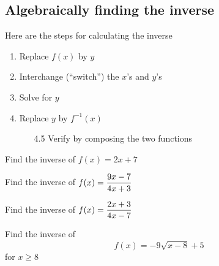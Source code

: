 \ifprintanswers\else\newpage\fi

\subsection{Algebraically finding the inverse}

Here are the steps for calculating the inverse

\begin{enumerate}[1)]
    \item Replace $f(x)$ by $y$
    \item Interchange (``switch'') the $x$'s and $y$'s
    \item Solve for $y$
    \item Replace $y$ by $f^{-1}(x)$
\begin{enumerate}
    \item[4.5] Verify by composing the two functions 
\end{enumerate}
\end{enumerate}

\vspace{0.5em}

\begin{exercise}
Find the inverse of $f(x)=2x+7$
\end{exercise}
\begin{solution}[2in]

\end{solution}

\begin{exercise}
Find the inverse of $\displaystyle f(x)=\frac{9x-7}{4x+3}$
\end{exercise}
\begin{solution}[4in]

\end{solution}

\begin{exercise}
Find the inverse of $\displaystyle f(x)=\frac{2x+3}{4x-7}$
\end{exercise}
\begin{solution}[4in]

\end{solution}

\begin{exercise}
Find the inverse of
\[
f(x)=-9\sqrt{x-8}+5
\]
for $x\geq8$
\end{exercise}
\begin{solution}[3in]

\end{solution}

